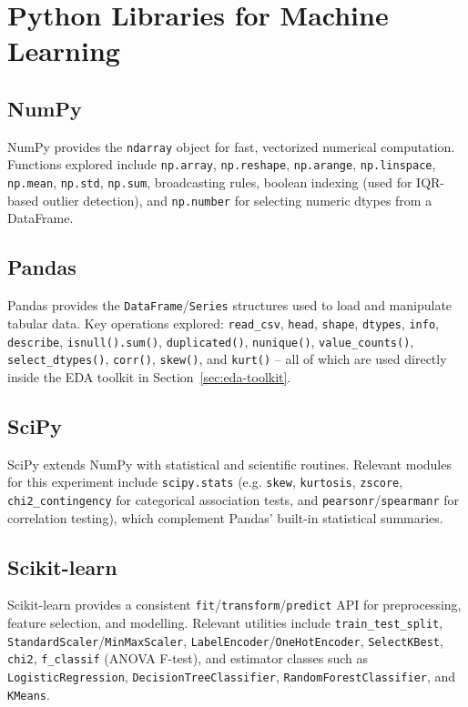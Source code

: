 \documentclass[12pt,a4paper]{article}
\begin{document}
\section{Python Libraries for Machine Learning}

\subsection{NumPy}
NumPy provides the \texttt{ndarray} object for fast, vectorized numerical computation.
Functions explored include \texttt{np.array}, \texttt{np.reshape}, \texttt{np.arange},
\texttt{np.linspace}, \texttt{np.mean}, \texttt{np.std}, \texttt{np.sum}, broadcasting rules,
boolean indexing (used for IQR-based outlier detection), and \texttt{np.number} for
selecting numeric dtypes from a DataFrame.

\subsection{Pandas}
Pandas provides the \texttt{DataFrame}/\texttt{Series} structures used to load and manipulate
tabular data. Key operations explored: \texttt{read\_csv}, \texttt{head}, \texttt{shape},
\texttt{dtypes}, \texttt{info}, \texttt{describe}, \texttt{isnull().sum()},
\texttt{duplicated()}, \texttt{nunique()}, \texttt{value\_counts()},
\texttt{select\_dtypes()}, \texttt{corr()}, \texttt{skew()}, and \texttt{kurt()} --
all of which are used directly inside the EDA toolkit in Section~\ref{sec:eda-toolkit}.

\subsection{SciPy}
SciPy extends NumPy with statistical and scientific routines. Relevant modules for this
experiment include \texttt{scipy.stats} (e.g. \texttt{skew}, \texttt{kurtosis},
\texttt{zscore}, \texttt{chi2\_contingency} for categorical association tests, and
\texttt{pearsonr}/\texttt{spearmanr} for correlation testing), which complement Pandas'
built-in statistical summaries.

\subsection{Scikit-learn}
Scikit-learn provides a consistent \texttt{fit}/\texttt{transform}/\texttt{predict} API for
preprocessing, feature selection, and modelling. Relevant utilities include
\texttt{train\_test\_split}, \texttt{StandardScaler}/\texttt{MinMaxScaler},
\texttt{LabelEncoder}/\texttt{OneHotEncoder}, \texttt{SelectKBest}, \texttt{chi2}, \texttt{f\_classif}
(ANOVA F-test), and estimator classes such as \texttt{LogisticRegression},
\texttt{DecisionTreeClassifier}, \texttt{RandomForestClassifier}, and \texttt{KMeans}.
\end{document}
